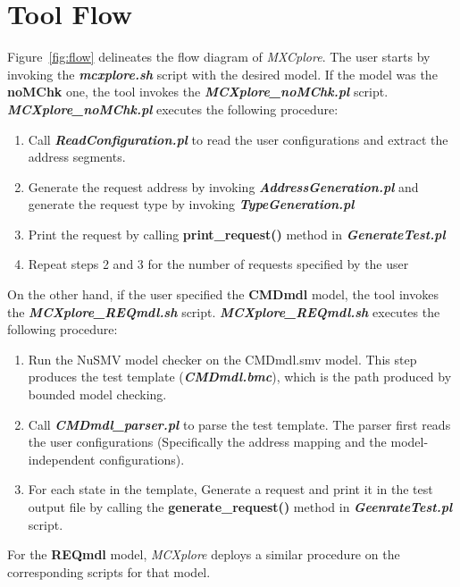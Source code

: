 \section{Tool Flow}
Figure~\ref{fig:flow} delineates the flow diagram of \textit{MXCplore}. 
The user starts by invoking the \textbf{\textit{mcxplore.sh}} script with the desired model. 
If the model was the \textbf{noMChk} one, the tool invokes the \textbf{\textit{MCXplore\_noMChk.pl}} script. 
\textbf{\textit{MCXplore\_noMChk.pl}} executes the following procedure:
\begin{enumerate}
\item Call \textbf{\textit{ReadConfiguration.pl}} to read the user configurations and extract the address segments. 

\item Generate the request address by invoking \textbf{\textit{AddressGeneration.pl}} and generate the request type by invoking \textbf{\textit{TypeGeneration.pl}} 

\item Print the request by calling \textbf{print\_request()} method in \textbf{\textit{GenerateTest.pl}} 
\item Repeat steps 2 and 3 for the number of requests specified by the user 
\end{enumerate} 

On the other hand, if the user specified the \textbf{CMDmdl} model, the tool invokes  the \textbf{\textit{MCXplore\_REQmdl.sh}} script. 
\textbf{\textit{MCXplore\_REQmdl.sh}} executes the following procedure: 

\begin{enumerate}
\item Run the NuSMV model checker on the CMDmdl.smv model. This step produces the test template (\textbf{\textit{CMDmdl.bmc}}), which is the path produced by bounded model checking. 

\item Call \textbf{\textit{CMDmdl\_parser.pl}} to parse the test template. The parser first reads the user configurations (Specifically the address mapping and the model-independent configurations). 

\item For each state in the template, Generate a request and print it in the test output file by calling the \textbf{generate\_request()} method in \textbf{\textit{GeenrateTest.pl}} script.
\end{enumerate} 

For the \textbf{REQmdl} model, \textit{MCXplore} deploys a similar procedure on the corresponding scripts for that model.





